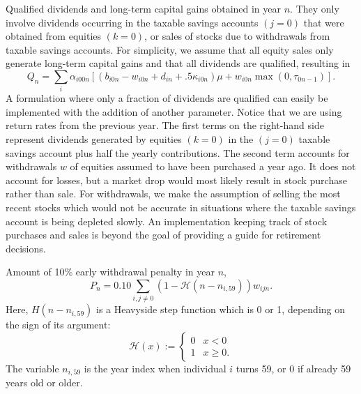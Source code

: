 \documentclass{report}[fleqn,12pt]
\begin{document}
\begin{description}[leftmargin=4em,style=multiline]
\item [$Q_n$]
	Qualified dividends and long-term capital gains obtained in year $n$.
	They only involve dividends occurring in the taxable savings accounts $(j=0)$ that
	were obtained from equities $(k=0)$, or sales of stocks due to withdrawals
	from taxable savings accounts.
	For simplicity, we assume that all equity sales only generate long-term capital gains and
	that all dividends are qualified, resulting in
	\begin{equation}
		\label{Eq:Qx2}
		Q_n = \sum_{i} \alpha_{i00n}\left[(b_{i0n} - w_{i0n} + d_{in} + .5\kappa_{i0n})\mu +
		w_{i0n}{\max(0, \tau_{0n-1})}\right].
	\end{equation}
	A formulation where only a fraction of dividends are qualified can easily be
	implemented with the addition of another parameter.
	Notice that we are using return rates from the previous year.
	The first terms on the right-hand side represent dividends generated by
        equities $(k=0)$ in the $(j=0)$ taxable savings account plus
	half the yearly contributions. The second term accounts for withdrawals $w$
        of equities assumed to have been purchased a year ago. 
	It does not account for losses, but a market drop
	would most likely result in stock purchase rather than sale.
	For withdrawals, we make the assumption of
	selling the most recent stocks which would not be accurate in situations where
	the taxable savings account is being depleted slowly. An implementation keeping track
	of stock purchases and sales is beyond the goal of providing a guide for retirement decisions.

\item [$P_n$]
	Amount of 10\% early withdrawal penalty in year $n$,
	\begin{equation}
		\label{Eq:PenTax0}
		P_n = 0.10 \sum_{i, j\neq0} (1 - \mathcal{H}(n - n_{i,59})) w_{ijn}.
	\end{equation}
        Here, $H(n - n_{i, 59})$ is a Heavyside step function which is 0 or 1, depending on the sign of
        its argument:
	\begin{equation}
	\mathcal{H}(x) :=
	\begin{cases}
         0 & x < 0 \\
         1 & x \geq 0.
	\end{cases}
	\end{equation}
        The variable $n_{i, 59}$ is the year index when individual $i$ turns 59,
	or 0 if already 59 years old or older.


\end{description}
\end{document}
